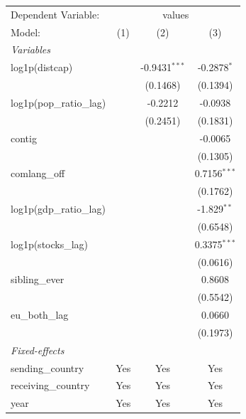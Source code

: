 
\begingroup
\centering
\begin{tabular}{lccc}
   \tabularnewline \midrule \midrule
   Dependent Variable: & \multicolumn{3}{c}{values}\\
   Model:                        & (1)     & (2)             & (3)\\  
   \midrule
   \emph{Variables}\\
   log1p(distcap)                &         & -0.9431$^{***}$ & -0.2878$^{*}$\\   
                                 &         & (0.1468)        & (0.1394)\\   
   log1p(pop\_ratio\_lag)        &         & -0.2212         & -0.0938\\   
                                 &         & (0.2451)        & (0.1831)\\   
   contig                        &         &                 & -0.0065\\   
                                 &         &                 & (0.1305)\\   
   comlang\_off                  &         &                 & 0.7156$^{***}$\\   
                                 &         &                 & (0.1762)\\   
   log1p(gdp\_ratio\_lag)        &         &                 & -1.829$^{**}$\\   
                                 &         &                 & (0.6548)\\   
   log1p(stocks\_lag)            &         &                 & 0.3375$^{***}$\\   
                                 &         &                 & (0.0616)\\   
   sibling\_ever                 &         &                 & 0.8608\\   
                                 &         &                 & (0.5542)\\   
   eu\_both\_lag                 &         &                 & 0.0660\\   
                                 &         &                 & (0.1973)\\   
   \midrule
   \emph{Fixed-effects}\\
   sending\_country              & Yes     & Yes             & Yes\\  
   receiving\_country            & Yes     & Yes             & Yes\\  
   year                          & Yes     & Yes             & Yes\\  

\end{tabular}
